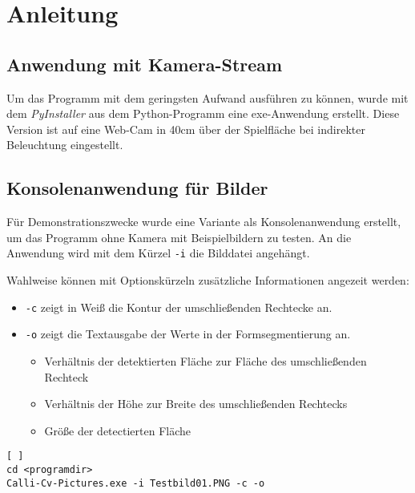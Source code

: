
\section{Anleitung}
\label{sec:Anleitung}

\subsection{Anwendung mit Kamera-Stream}
Um das Programm mit dem geringsten Aufwand ausführen zu können, wurde mit dem \emph{PyInstaller} aus dem Python-Programm eine exe-Anwendung erstellt. Diese Version ist auf eine Web-Cam in 40cm über der Spielfläche bei indirekter Beleuchtung eingestellt. 


\subsection{Konsolenanwendung für Bilder}
Für Demonstrationszwecke wurde eine Variante als Konsolenanwendung erstellt, um das Programm ohne Kamera mit Beispielbildern zu testen. 
An die Anwendung wird mit dem Kürzel \lstinline{-i} die Bilddatei angehängt.
 
Wahlweise können mit Optionskürzeln zusätzliche Informationen angezeit werden:
\begin{itemize}
\item \lstinline{-c} zeigt in Weiß die Kontur der umschließenden Rechtecke an. 
\item \lstinline{-o} zeigt die Textausgabe der Werte in der Formsegmentierung an.
\begin{itemize}
\item Verhältnis der detektierten Fläche zur Fläche des umschließenden Rechteck
\item Verhältnis der Höhe zur Breite des umschließenden Rechtecks
\item Größe der detectierten Fläche
\end{itemize}
\end{itemize}
\begin{lstlisting}[ ]
cd <programdir>
Calli-Cv-Pictures.exe -i Testbild01.PNG -c -o
\end{lstlisting}
